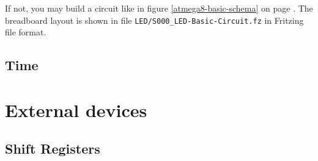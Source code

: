 \documentclass[twoside,english,12pt,authoryear,openright]{book}
\begin{document}
If not, you may build a circuit like in figure \ref{atmega8-basic-schema} on page \pageref{atmega8-basic-schema}. The breadboard layout is shown in file \texttt{LED/S000\_LED-Basic-Circuit.fz} in Fritzing file format.








\chapter{Time}




\part{External devices}

\chapter{Shift Registers}


\end{document}
